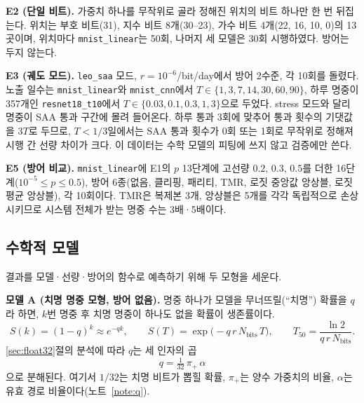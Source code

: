 \documentclass[11pt,a4paper]{article}
\newcommand{\code}[1]{\texttt{#1}}
\newcounter{note}
\begin{document}
\textbf{E2 (단일 비트).} 가중치 하나를 무작위로 골라 정해진 위치의 비트 하나만 한 번 뒤집는다. 위치는 부호 비트(31), 지수 비트 8개(30--23), 가수 비트 4개(22, 16, 10, 0)의 13곳이며, 위치마다 \code{mnist\_linear}는 50회, 나머지 세 모델은 30회 시행하였다. 방어는 두지 않는다.

\textbf{E3 (궤도 모드).} \code{leo\_saa} 모드, $r=10^{-6}$/bit/day에서 방어 2수준, 각 10회를 돌렸다. 노출 일수는 \code{mnist\_linear}와 \code{mnist\_cnn}에서 $T\in\{1,3,7,14,30,60,90\}$, 하루 명중이 357개인 \code{resnet18\_t10}에서 $T\in\{0.03,0.1,0.3,1,3\}$으로 두었다. stress 모드와 달리 명중이 SAA 통과 구간에 몰려 들어온다. 하루 통과 3회에 맞추어 통과 횟수의 기댓값을 $3T$로 두므로, $T<1/3$일에서는 SAA 통과 횟수가 0회 또는 1회로 무작위로 정해져 시행 간 선량 차이가 크다. 이 데이터는 수학 모델의 피팅에 쓰지 않고 검증에만 쓴다.

\textbf{E5 (방어 비교).} \code{mnist\_linear}에 E1의 $p$ 13단계에 고선량 $0.2,\,0.3,\,0.5$를 더한 16단계($10^{-5}\le p\le0.5$), 방어 6종(없음, 클리핑, 패리티, TMR, 로짓 중앙값 앙상블, 로짓 평균 앙상블), 각 10회이다. TMR은 복제본 3개, 앙상블은 5개를 각각 독립적으로 손상시키므로 시스템 전체가 받는 명중 수는 3배·5배이다.

\subsection{수학적 모델}
\label{sec:mathmodel}
결과를 모델·선량·방어의 함수로 예측하기 위해 두 모형을 세운다.

\textbf{모델 A (치명 명중 모형, 방어 없음).} 명중 하나가 모델을 무너뜨릴(``치명'') 확률을 $q$라 하면, $k$번 명중 후 치명 명중이 하나도 없을 확률이 생존률이다.
\begin{equation}
  S(k) = (1-q)^{k} \approx e^{-qk}, \qquad
  S(T) = \exp\!\big(-q\,r\,N_{\mathrm{bits}}\,T\big), \qquad
  T_{50} = \frac{\ln 2}{q\,r\,N_{\mathrm{bits}}}.
  \label{eq:modelA}
\end{equation}
\ref{sec:float32}절의 분석에 따라 $q$는 세 인자의 곱
\begin{equation}
  q = \tfrac{1}{32}\,\pi_+\,\alpha
  \label{eq:q}
\end{equation}
으로 분해된다. 여기서 $1/32$는 치명 비트가 뽑힐 확률, $\pi_+$는 양수 가중치의 비율, $\alpha$는 유효 경로 비율이다(노트~\ref{note:q}).
\end{document}
